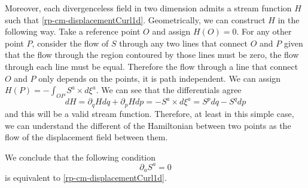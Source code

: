 Moreover, each divergenceless field in two dimension admits a stream function $H$ such that \ref{rp-cm-displacementCurl1d}. Geometrically, we can construct $H$ in the following way. Take a reference point $O$ and assign $H(O) = 0$. For any other point $P$, consider the flow of $S$ through any two lines that connect $O$ and $P$ given that the flow through the region contoured by those lines must be zero, the flow through each line must be equal. Therefore the flow through a line that connect $O$ and $P$ only depends on the points, it is path independent. We can assign $H(P) = - \int_{OP} S^a \times d\xi^a$. We can see that the differentials agree
\begin{equation}
	dH = \partial_q H dq + \partial_p H dp = - S^a \times d\xi^a = S^p dq - S^q dp
\end{equation}
and this will be a valid stream function. Therefore, at least in this simple case, we can understand the different of the Hamiltonian between two points as the flow of the displacement field between them.

We conclude that the following condition
\begin{equation}\label{rp-cm-divergenceless1d}
	\tag{HM-2}
	\partial_a S^a = 0
\end{equation}
is equivalent to \ref{rp-cm-displacementCurl1d}.

